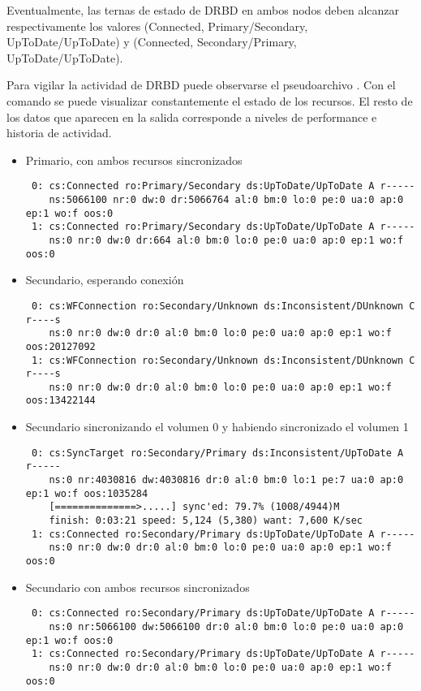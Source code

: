 Eventualmente, las ternas de estado de DRBD en ambos nodos deben alcanzar respectivamente los valores (Connected, Primary/Secondary, UpToDate/UpToDate) y (Connected, Secondary/Primary, UpToDate/UpToDate).


Para vigilar la actividad de DRBD puede observarse el pseudoarchivo . Con el comando  se puede visualizar constantemente el estado de los recursos. El resto de los datos que aparecen en la salida corresponde a niveles de performance e historia de actividad. 


\begin{itemize}
	\item Primario, con ambos recursos sincronizados
	\begin{lstlisting}
 0: cs:Connected ro:Primary/Secondary ds:UpToDate/UpToDate A r-----
    ns:5066100 nr:0 dw:0 dr:5066764 al:0 bm:0 lo:0 pe:0 ua:0 ap:0 ep:1 wo:f oos:0
 1: cs:Connected ro:Primary/Secondary ds:UpToDate/UpToDate A r-----
    ns:0 nr:0 dw:0 dr:664 al:0 bm:0 lo:0 pe:0 ua:0 ap:0 ep:1 wo:f oos:0
	\end{lstlisting}
	\item Secundario, esperando conexión 
\begin{lstlisting}
 0: cs:WFConnection ro:Secondary/Unknown ds:Inconsistent/DUnknown C r----s
    ns:0 nr:0 dw:0 dr:0 al:0 bm:0 lo:0 pe:0 ua:0 ap:0 ep:1 wo:f oos:20127092
 1: cs:WFConnection ro:Secondary/Unknown ds:Inconsistent/DUnknown C r----s
    ns:0 nr:0 dw:0 dr:0 al:0 bm:0 lo:0 pe:0 ua:0 ap:0 ep:1 wo:f oos:13422144
\end{lstlisting}
	\item Secundario sincronizando el volumen 0 y habiendo sincronizado el volumen 1
\begin{lstlisting}
 0: cs:SyncTarget ro:Secondary/Primary ds:Inconsistent/UpToDate A r-----
    ns:0 nr:4030816 dw:4030816 dr:0 al:0 bm:0 lo:1 pe:7 ua:0 ap:0 ep:1 wo:f oos:1035284
	[==============>.....] sync'ed: 79.7% (1008/4944)M
	finish: 0:03:21 speed: 5,124 (5,380) want: 7,600 K/sec
 1: cs:Connected ro:Secondary/Primary ds:UpToDate/UpToDate A r-----
    ns:0 nr:0 dw:0 dr:0 al:0 bm:0 lo:0 pe:0 ua:0 ap:0 ep:1 wo:f oos:0
\end{lstlisting}
	\item Secundario con ambos recursos sincronizados
	\begin{lstlisting}
 0: cs:Connected ro:Secondary/Primary ds:UpToDate/UpToDate A r-----
    ns:0 nr:5066100 dw:5066100 dr:0 al:0 bm:0 lo:0 pe:0 ua:0 ap:0 ep:1 wo:f oos:0
 1: cs:Connected ro:Secondary/Primary ds:UpToDate/UpToDate A r-----
    ns:0 nr:0 dw:0 dr:0 al:0 bm:0 lo:0 pe:0 ua:0 ap:0 ep:1 wo:f oos:0
	\end{lstlisting}
\end{itemize}






